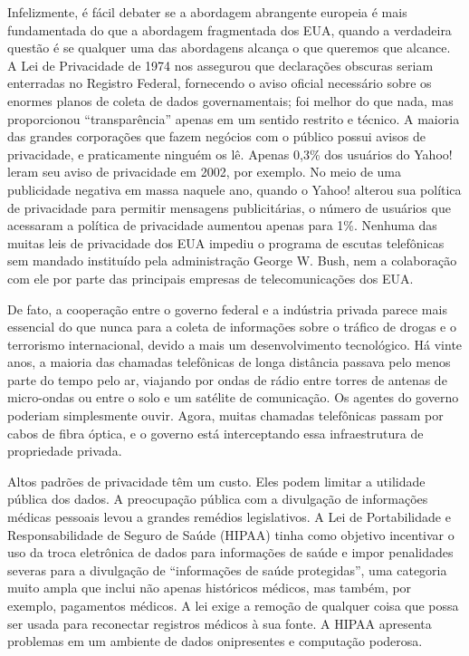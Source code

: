 \documentclass{book}
\begin{document}
Infelizmente, é fácil debater se a abordagem abrangente europeia é mais
fundamentada do que a abordagem fragmentada dos EUA, quando a verdadeira
questão é se qualquer uma das abordagens alcança o que queremos que alcance. A
Lei de Privacidade de 1974 nos assegurou que declarações obscuras seriam
enterradas no Registro Federal, fornecendo o aviso oficial necessário sobre os
enormes planos de coleta de dados governamentais; foi melhor do que nada, mas
proporcionou ``transparência'' apenas em um sentido restrito e técnico. A
maioria das grandes corporações que fazem negócios com o público possui avisos
de privacidade, e praticamente ninguém os lê. Apenas 0,3\% dos usuários do
Yahoo! leram seu aviso de privacidade em 2002, por exemplo. No meio de uma
publicidade negativa em massa naquele ano, quando o Yahoo! alterou sua política
de privacidade para permitir mensagens publicitárias, o número de usuários que
acessaram a política de privacidade aumentou apenas para 1\%. Nenhuma das
muitas leis de privacidade dos EUA impediu o programa de escutas telefônicas
sem mandado instituído pela administração George W. Bush, nem a colaboração com
ele por parte das principais empresas de telecomunicações dos EUA.

De fato, a cooperação entre o governo federal e a indústria privada parece mais
essencial do que nunca para a coleta de informações sobre o tráfico de drogas e
o terrorismo internacional, devido a mais um desenvolvimento tecnológico. Há
vinte anos, a maioria das chamadas telefônicas de longa distância passava pelo
menos parte do tempo pelo ar, viajando por ondas de rádio entre torres de
antenas de micro-ondas ou entre o solo e um satélite de comunicação. Os agentes
do governo poderiam simplesmente ouvir. Agora, muitas chamadas telefônicas
passam por cabos de fibra óptica, e o governo está interceptando essa
infraestrutura de propriedade privada.

Altos padrões de privacidade têm um custo. Eles podem limitar a utilidade
pública dos dados. A preocupação pública com a divulgação de informações
médicas pessoais levou a grandes remédios legislativos. A Lei de Portabilidade
e Responsabilidade de Seguro de Saúde (HIPAA) tinha como objetivo incentivar o
uso da troca eletrônica de dados para informações de saúde e impor penalidades
severas para a divulgação de ``informações de saúde protegidas'', uma categoria
muito ampla que inclui não apenas históricos médicos, mas também, por exemplo,
pagamentos médicos. A lei exige a remoção de qualquer coisa que possa ser usada
para reconectar registros médicos à sua fonte. A HIPAA apresenta problemas em
um ambiente de dados onipresentes e computação poderosa.\\
\end{document}
